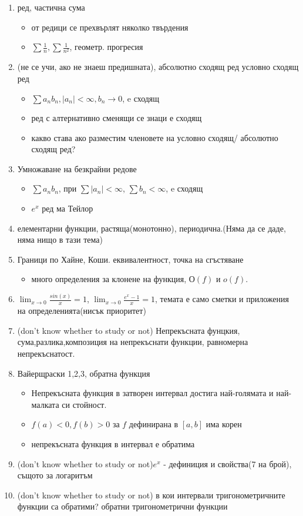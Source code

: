 \documentclass{article}
\begin{document}
\begin{enumerate}
	\item ред, частична сума
	\begin{itemize}
		\item от редици се прехвърлят няколко твърдения
		\item $\sum \frac{1}{n}, \sum \frac{1}{n^2} $, геометр. прогресия
	\end{itemize}
	\item (не се учи, ако не знаеш предишната), абсолютно сходящ ред условно сходящ ред
	\begin{itemize}
		\item $\sum a_n b_n, |a_n|<\infty, b_n \to 0 $, e сходящ
		\item ред с алтернативно сменящи се знаци е сходящ
		\item какво става ако разместим членовете на условно сходящ/ абсолютно сходящ ред?
	\end{itemize}
	\item Умножаване на безкрайни редове
	\begin{itemize}
		\item $\sum a_n b_n$, при $\sum|a_n|<\infty$, $\sum b_n <\infty$, e сходящ
		\item $e^x $ ред ма Тейлор
		\end{itemize}
	\item елементарни функции, растяща(монотонно), периодична.(Няма да се даде, няма нищо в тази тема)
	\item Граници по Хайне, Коши. еквивалентност, точка на сгъстяване
	\begin{itemize}
		\item много определения за клонене на функция, $О(f)$ и $o(f).$
	\end{itemize}
	
	
	\item $\lim_{x\to0} \frac{sin(x)}{x} = 1  $, $\lim_{x\to0} \frac{e^x-1}{x} = 1  $, темата е само сметки и приложения на определенията(нисък приоритет)
	
	\item (don't know whether to study or not) Непрекъсната фунцкия, сума,разлика,композиция на непрекъснати функции, равномерна непрекъснатост.
	\item Вайерщраски 1,2,3, обратна функция
	\begin{itemize}
		\item Непрекъсната функция в затворен интервал достига най-голямата и най-малката си стойност.
		\item $f(a) < 0, f(b)>0 $ за $f$ дефинирана в $[a,b]$ има корен
		\item непрекъсната функция в интервал е обратима
	\end{itemize}
	\item (don't know whether to study or not)$e^x$ - дефиниция и свойства(7 на брой), същото за логаритъм
	\item (don't know whether to study or not) в кои интервали тригонометричните функции са обратими? обратни тригонометрични функции
	

\end{enumerate}
\end{document}
